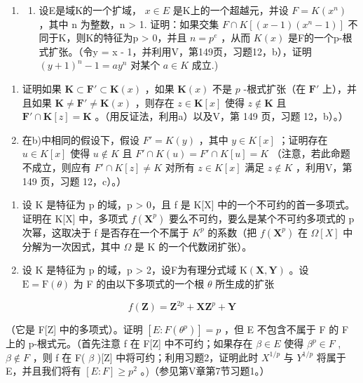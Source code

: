 \BourbakiExerciseGroup

\begin{enumerate}
\def\labelenumi{\arabic{enumi})}
\tightlist
\item
  \begin{enumerate}
  \def\labelenumii{\alph{enumii})}
  \tightlist
  \item
    设E是域K的一个扩域， \(x \in E\) 是K上的一个超越元，并设 \(F = K(x^{n})\) ，其中 n 为整数，n \textgreater{} 1. 证明：如果交集 \(F \cap K[(x - 1)(x^{n} - 1)]\) 不同于K，则K的特征为p \textgreater{} 0，并且 \(n = p^{e}\) ，从而 \(K(x)\) 是F的一个p-根式扩张。（令y = x - 1，并利用V，第149页，习题12，b），证明 \((y + 1)^{n} - 1 = ay^{n}\) 对某个 \(a \in K\) 成立.)
  \end{enumerate}
\end{enumerate}

\begin{enumerate}
\def\labelenumi{\alph{enumi})}
\setcounter{enumi}{1}
\item
  证明如果 \(\mathbf{K} \subset \mathbf{F}' \subset \mathbf{K}(x)\) ，如果 \(\mathbf{K}(x)\) 不是 \(p\) -根式扩张（在 \(\mathbf{F}'\) 上），并且如果 \(\mathbf{K} \neq \mathbf{F}' \neq \mathbf{K}(x)\) ，则存在 \(z \in \mathbf{K}[x]\) 使得 \(z \notin \mathbf{K}\) 且 \(\mathbf{F}' \cap \mathbf{K}[z] = \mathbf{K}\) 。（用反证法，利用a）以及V，第 149 页，习题 12，b）。）
\item
  在b)中相同的假设下，假设 \(F' = K(y)\) ，其中 \(y \in K[x]\) ；证明存在 \(u \in K[x]\) 使得 \(u \notin K\) 且 \(F' \cap K(u) = F' \cap K[u] = K\) （注意，若此命题不成立，则应有 \(F' \cap K[z] \neq K\) 对所有 \(z \in K[x]\) 满足 \(z \notin K\) ，利用V，第 149 页，习题 12，c）。）
\end{enumerate}

\begin{enumerate}
\def\labelenumi{\arabic{enumi})}
\setcounter{enumi}{1}
\item
  设 K 是特征为 p 的域，p \textgreater{} 0，且 f 是 K{[}X{]} 中的一个不可约的首一多项式。证明在 K{[}X{]} 中，多项式 \(f(\mathbf{X}^{p})\) 要么不可约，要么是某个不可约多项式的 p 次幂，这取决于 f 是否存在一个不属于 \(K^{p}\) 的系数（把 \(f(\mathbf{X}^{p})\) 在 \(\Omega[X]\) 中分解为一次因式，其中 \(\Omega\) 是 K 的一个代数闭扩张）。
\item
  设 K 是特征为 p 的域，p \textgreater{} 2，设F为有理分式域 \(\mathrm{K}(\mathbf{X}, \mathbf{Y})\) 。设 \(\mathrm{E} = \mathrm{F}(\theta)\) 为 F 的由以下多项式的一个根 \(\theta\) 所生成的扩张
\end{enumerate}

\[
f (\mathbf {Z}) = \mathbf {Z} ^ {2 p} + \mathbf {X Z} ^ {p} + \mathbf {Y}
\]

（它是 F{[}Z{]} 中的多项式）。证明 \([E:F(\theta^{p})]=p\) ，但 E 不包含不属于 F 的 F 上的 p-根式元。（首先注意 f 在 F{[}Z{]} 中不可约；如果存在 \(\beta\in E\) 使得 \(\beta^{p}\in F\) , \(\beta\notin F\) ，则 f 在 F( \(\beta\) ){[}Z{]} 中将可约；利用习题2，证明此时 \(X^{1/p}\) 与 \(Y^{1/p}\) 将属于 E，并且我们将有 \([E:F]\geqslant p^{2}\) 。)（参见第V章第7节习题1。）

